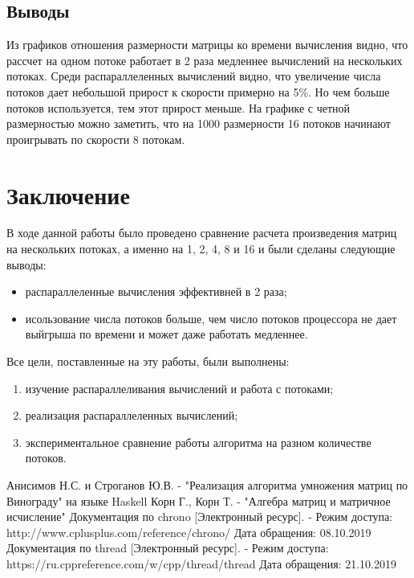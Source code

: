 \documentclass[a4paper,12pt]{article}
\newcommand{\anonsection}[1]{\section*{#1}\addcontentsline{toc}{section}{#1}}
\begin{document}
\subsection{Выводы}

Из графиков отношения размерности матрицы ко времени вычисления видно, что рассчет
на одном потоке работает в 2 раза медленнее вычислений на нескольких потоках.
Среди распараллеленных вычислений видно, что увеличение числа потоков дает
небольшой прирост к скорости примерно на 5\%. Но чем больше потоков используется, тем
этот прирост меньше. На графике с четной размерностью можно заметить, что на 1000
размерности 16 потоков начинают проигрывать по скорости 8 потокам.

\newpage
\anonsection{Заключение}

В ходе данной работы было проведено сравнение расчета произведения матриц на нескольких потоках,
а именно на 1, 2, 4, 8 и 16 и были сделаны следующие выводы:

\begin{itemize}
    \item распараллеленные вычисления эффективней в 2 раза;
    \item исользование числа потоков больше, чем число потоков процессора не дает
        выйгрыша по времени и может даже работать медленнее.
\end{itemize}

Все цели, поставленные на эту работы, были выполнены:

\begin{enumerate}
    \item изучение распараллеливания вычислений и работа с потоками;
    \item реализация распараллеленных вычислений;
    \item экспериментальное сравнение работы алгоритма на разном количестве потоков.
\end{enumerate}

\newpage
{}

\begin{thebibliography}{}
     Анисимов Н.С. и Строганов Ю.В. - "Реализация алгоритма умножения матриц по Винограду"
на языке Haskell
     Корн Г., Корн Т. - "Алгебра матриц и матричное исчисление"
     Документация по chrono [Электронный ресурс]. -
    Режим доступа: http://www.cplusplus.com/reference/chrono/
    Дата обращения: 08.10.2019
     Документация по thread [Электронный ресурс]. -
    Режим доступа: https://ru.cppreference.com/w/cpp/thread/thread
    Дата обращения: 21.10.2019
\end{thebibliography}
\end{document}

